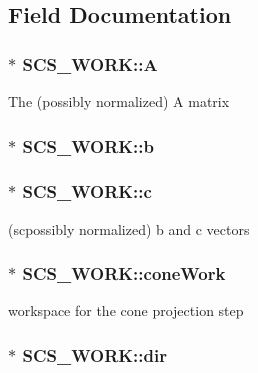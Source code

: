 \subsection{Field Documentation}
\hypertarget{struct_s_c_s___w_o_r_k_afe6650f1ce2c18865f73314ed5b49261}{
\subsubsection[{A}]{$\ast$ S\-C\-S\-\_\-\-W\-O\-R\-K\-::\-A}}\label{struct_s_c_s___w_o_r_k_afe6650f1ce2c18865f73314ed5b49261}
The (possibly normalized) A matrix \hypertarget{struct_s_c_s___w_o_r_k_af34066f7314e529b105b1a88776eb2c7}{
\subsubsection[{b}]{$\ast$ S\-C\-S\-\_\-\-W\-O\-R\-K\-::b}}\label{struct_s_c_s___w_o_r_k_af34066f7314e529b105b1a88776eb2c7}
\hypertarget{struct_s_c_s___w_o_r_k_a28739f0f5ed9b1f2184133571a5963a1}{
\subsubsection[{c}]{$\ast$ S\-C\-S\-\_\-\-W\-O\-R\-K\-::c}}\label{struct_s_c_s___w_o_r_k_a28739f0f5ed9b1f2184133571a5963a1}
(scpossibly normalized) b and c vectors \hypertarget{struct_s_c_s___w_o_r_k_a6286cc9b1462d1f0adf9046b03ca6277}{
\subsubsection[{cone\-Work}]{$\ast$ S\-C\-S\-\_\-\-W\-O\-R\-K\-::cone\-Work}}\label{struct_s_c_s___w_o_r_k_a6286cc9b1462d1f0adf9046b03ca6277}
workspace for the cone projection step \hypertarget{struct_s_c_s___w_o_r_k_a2f5ec63f05a0d782eed2435d24e018b0}{
\subsubsection[{dir}]{$\ast$ S\-C\-S\-\_\-\-W\-O\-R\-K\-::dir}}\label{struct_s_c_s___w_o_r_k_a2f5ec63f05a0d782eed2435d24e018b0}
